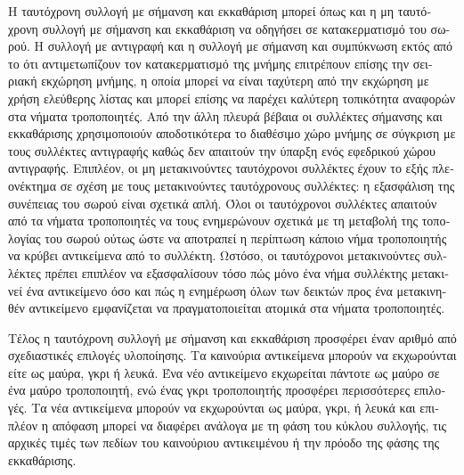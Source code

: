 \begin{greek}
Η ταυτόχρονη συλλογή με σήμανση και εκκαθάριση μπορεί όπως
και η μη ταυτόχρονη συλλογή με σήμανση και εκκαθάριση να
οδηγήσει σε κατακερματισμό του σωρού. Η συλλογή με αντιγραφή
και η συλλογή με σήμανση και συμπύκνωση εκτός από το ότι
αντιμετωπίζουν τον κατακερματισμό της μνήμης επιτρέπουν
επίσης την σειριακή εκχώρηση μνήμης, η οποία μπορεί να
είναι ταχύτερη από την εκχώρηση με χρήση ελεύθερης λίστας
και μπορεί επίσης να παρέχει καλύτερη τοπικότητα αναφορών
στα νήματα τροποποιητές. Από την άλλη πλευρά βέβαια οι συλλέκτες
σήμανσης και εκκαθάρισης χρησιμοποιούν αποδοτικότερα το
διαθέσιμο χώρο μνήμης σε σύγκριση με τους συλλέκτες αντιγραφής
καθώς δεν απαιτούν την ύπαρξη ενός εφεδρικού χώρου αντιγραφής.
Επιπλέον, οι μη μετακινούντες ταυτόχρονοι συλλέκτες έχουν
το εξής πλεονέκτημα σε σχέση με τους μετακινούντες ταυτόχρονους
συλλέκτες: η εξασφάλιση της συνέπειας του σωρού είναι σχετικά
απλή. Όλοι οι ταυτόχρονοι συλλέκτες απαιτούν από τα νήματα
τροποποιητές να τους ενημερώνουν σχετικά με τη μεταβολή της
τοπολογίας του σωρού ούτως ώστε να αποτραπεί η περίπτωση κάποιο
νήμα τροποποιητής να κρύβει αντικείμενα από το συλλέκτη. Ωστόσο,
οι ταυτόχρονοι μετακινούντες συλλέκτες πρέπει επιπλέον να
εξασφαλίσουν τόσο πώς μόνο ένα νήμα συλλέκτης μετακινεί ένα
αντικείμενο όσο και πώς η ενημέρωση όλων των δεικτών προς
ένα μετακινηθέν αντικείμενο εμφανίζεται να πραγματοποιείται
ατομικά στα νήματα τροποποιητές.

Τέλος η ταυτόχρονη συλλογή με σήμανση και εκκαθάριση προσφέρει
έναν αριθμό από σχεδιαστικές επιλογές υλοποίησης. Τα καινούρια
αντικείμενα μπορούν να εκχωρούνται είτε ως μαύρα, γκρι ή λευκά.
Ένα νέο αντικείμενο εκχωρείται πάντοτε ως μαύρο σε ένα μαύρο
τροποποιητή, ενώ ένας γκρι τροποποιητής προσφέρει περισσότερες
επιλογές. Τα νέα αντικείμενα μπορούν να εκχωρούνται ως μαύρα,
γκρι, ή λευκά και επιπλέον η απόφαση μπορεί να διαφέρει ανάλογα
με τη φάση του κύκλου συλλογής, τις αρχικές τιμές των πεδίων
του καινούριου αντικειμένου ή την πρόοδο της φάσης της εκκαθάρισης.


\end{greek}
